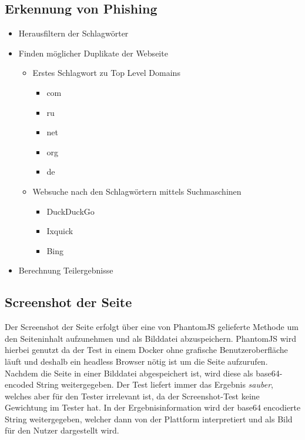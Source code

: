 \subsection{Erkennung von Phishing}
\label{sec:umsetzung-phishungdetector}


\begin{itemize}
  \item Herausfiltern der Schlagwörter
  \item Finden möglicher Duplikate der Webseite
  \begin{itemize}
    \item Erstes Schlagwort zu Top Level Domains
    \begin{itemize}
      \item com
      \item ru
      \item net
      \item org
      \item de
    \end{itemize}
    \item Websuche nach den Schlagwörtern mittels Suchmaschinen
    \begin{itemize}
      \item DuckDuckGo
      \item Ixquick
      \item Bing
    \end{itemize}
  \end{itemize}
  \item Berechnung Teilergebnisse
\end{itemize}

\subsection{Screenshot der Seite}
Der Screenshot der Seite erfolgt über eine von PhantomJS gelieferte Methode um den Seiteninhalt aufzunehmen und als Bilddatei abzuspeichern. PhantomJS wird hierbei genutzt da der Test in einem Docker ohne grafische Benutzeroberfläche läuft und deshalb ein headless Browser nötig ist um die Seite aufzurufen. Nachdem die Seite in einer Bilddatei abgespeichert ist, wird diese als base64-encoded String weitergegeben. Der Test liefert immer das Ergebnis \textit{sauber}, welches aber für den Tester irrelevant ist, da der Screenshot-Test keine Gewichtung im Tester hat. In der Ergebnisinformation wird der base64 encodierte String weitergegeben, welcher dann von der Plattform interpretiert und als Bild für den Nutzer dargestellt wird.
